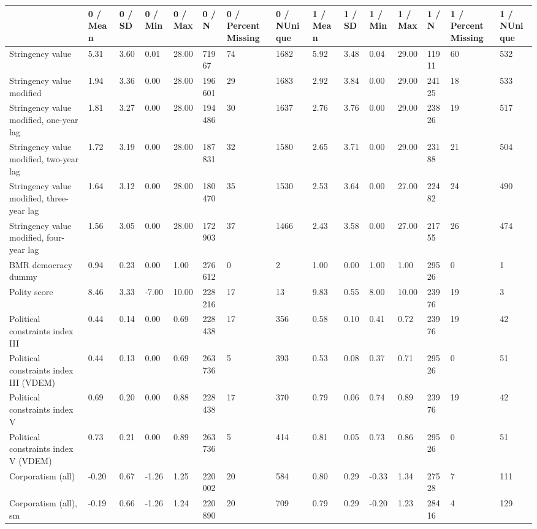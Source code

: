 
\begin{longtable}{lllllllllllllll}
\toprule
  & 0 / Mean & 0 / SD & 0 / Min & 0 / Max & 0 / N & 0 / PercentMissing & 0 / NUnique & 1 / Mean & 1 / SD & 1 / Min & 1 / Max & 1 / N & 1 / PercentMissing & 1 / NUnique\\
\midrule
Stringency value & 5.31 & 3.60 & 0.01 & 28.00 & 71967 & 74 & 1682 & 5.92 & 3.48 & 0.04 & 29.00 & 11911 & 60 & 532\\
Stringency value modified & 1.94 & 3.36 & 0.00 & 28.00 & 196601 & 29 & 1683 & 2.92 & 3.84 & 0.00 & 29.00 & 24125 & 18 & 533\\
Stringency value modified, one-year lag & 1.81 & 3.27 & 0.00 & 28.00 & 194486 & 30 & 1637 & 2.76 & 3.76 & 0.00 & 29.00 & 23826 & 19 & 517\\
Stringency value modified, two-year lag & 1.72 & 3.19 & 0.00 & 28.00 & 187831 & 32 & 1580 & 2.65 & 3.71 & 0.00 & 29.00 & 23188 & 21 & 504\\
Stringency value modified, three-year lag & 1.64 & 3.12 & 0.00 & 28.00 & 180470 & 35 & 1530 & 2.53 & 3.64 & 0.00 & 27.00 & 22482 & 24 & 490\\
\addlinespace
Stringency value modified, four-year lag & 1.56 & 3.05 & 0.00 & 28.00 & 172903 & 37 & 1466 & 2.43 & 3.58 & 0.00 & 27.00 & 21755 & 26 & 474\\
BMR democracy dummy & 0.94 & 0.23 & 0.00 & 1.00 & 276612 & 0 & 2 & 1.00 & 0.00 & 1.00 & 1.00 & 29526 & 0 & 1\\
Polity score & 8.46 & 3.33 & -7.00 & 10.00 & 228216 & 17 & 13 & 9.83 & 0.55 & 8.00 & 10.00 & 23976 & 19 & 3\\
Political constraints index III & 0.44 & 0.14 & 0.00 & 0.69 & 228438 & 17 & 356 & 0.58 & 0.10 & 0.41 & 0.72 & 23976 & 19 & 42\\
Political constraints index III (VDEM) & 0.44 & 0.13 & 0.00 & 0.69 & 263736 & 5 & 393 & 0.53 & 0.08 & 0.37 & 0.71 & 29526 & 0 & 51\\
\addlinespace
Political constraints index V & 0.69 & 0.20 & 0.00 & 0.88 & 228438 & 17 & 370 & 0.79 & 0.06 & 0.74 & 0.89 & 23976 & 19 & 42\\
Political constraints index V (VDEM) & 0.73 & 0.21 & 0.00 & 0.89 & 263736 & 5 & 414 & 0.81 & 0.05 & 0.73 & 0.86 & 29526 & 0 & 51\\
Corporatism (all) & -0.20 & 0.67 & -1.26 & 1.25 & 220002 & 20 & 584 & 0.80 & 0.29 & -0.33 & 1.34 & 27528 & 7 & 111\\
Corporatism (all), sm & -0.19 & 0.66 & -1.26 & 1.24 & 220890 & 20 & 709 & 0.79 & 0.29 & -0.20 & 1.23 & 28416 & 4 & 129\\

\end{longtable}
